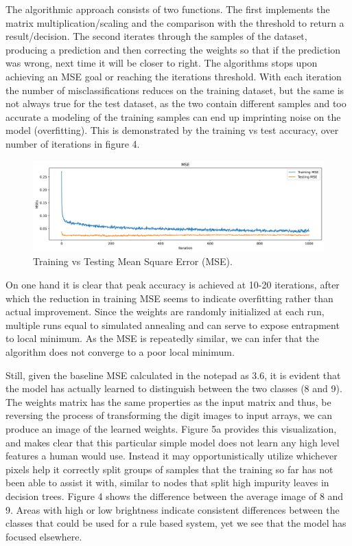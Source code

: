 \documentclass{article}
\begin{document}
The algorithmic approach consists of two functions.
The first implements the matrix multiplication/scaling and the comparison with the threshold to return a result/decision.
The second iterates through the samples of the dataset, producing a prediction and then correcting the weights so that if the prediction was wrong, next time it will be closer to right.
The algorithms stops upon achieving an MSE goal or reaching the iterations threshold.
With each iteration the number of misclassifications reduces on the training dataset, but the same is not always true for the test dataset, as the two contain different samples and too accurate a modeling of the training samples can end up imprinting noise on the model (overfitting).
This is demonstrated by the training vs test accuracy, over number of iterations in figure 4.

\begin{figure}[h!]
    \centering
    \includegraphics[width=\textwidth]{./plots/plot5.png}  %
    \caption{Training vs Testing Mean Square Error (MSE).}
    \label{fig:plot6}  %
\end{figure}

On one hand it is clear that peak accuracy is achieved at 10-20 iterations, after which the reduction in training MSE seems to indicate overfitting rather than actual improvement.
Since the weights are randomly initialized at each run, multiple runs equal to simulated annealing and can serve to expose entrapment to local minimum.
As the MSE is repeatedly similar, we can infer that the algorithm does not converge to a poor local minimum.

Still, given the baseline MSE calculated in the notepad as 3.6, it is evident that the model has actually learned to distinguish between the two classes (8 and 9).
The weights matrix has the same properties as the input matrix and thus, be reversing the process of transforming the digit images to input arrays, we can produce an image of the learned weights.
Figure 5a provides this visualization, and makes clear that this particular simple model does not learn any high level features a human would use.
Instead it may opportunistically utilize whichever pixels help it correctly split groups of samples that the training so far has not been able to assist it with, similar to nodes that split high impurity leaves in decision trees.
Figure 4 shows the difference between the average image of 8 and 9.
Areas with high or low brightness indicate consistent differences between the classes that could be used for a rule based system, yet we see that the model has focused elsewhere.
\end{document}
